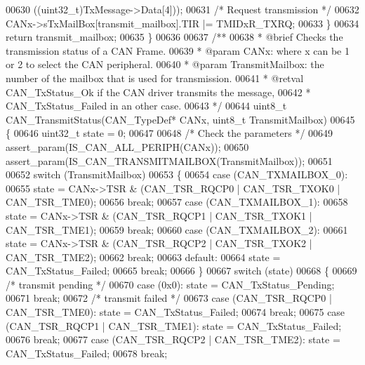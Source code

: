 \begin{DoxyCode}
00630                                              ((uint32\_t)TxMessage->Data[4]));
00631     \textcolor{comment}{/* Request transmission */}
00632     CANx->sTxMailBox[transmit\_mailbox].TIR |= TMIDxR_TXRQ;
00633   \}
00634   \textcolor{keywordflow}{return} transmit\_mailbox;
00635 \}
00636 
00637 \textcolor{comment}{/**}
00638 \textcolor{comment}{  * @brief  Checks the transmission status of a CAN Frame.}
00639 \textcolor{comment}{  * @param  CANx: where x can be 1 or 2 to select the CAN peripheral.}
00640 \textcolor{comment}{  * @param  TransmitMailbox: the number of the mailbox that is used for transmission.}
00641 \textcolor{comment}{  * @retval CAN\_TxStatus\_Ok if the CAN driver transmits the message, }
00642 \textcolor{comment}{  *         CAN\_TxStatus\_Failed in an other case.}
00643 \textcolor{comment}{  */}
00644 uint8\_t CAN_TransmitStatus(CAN\_TypeDef* CANx, uint8\_t TransmitMailbox)
00645 \{
00646   uint32\_t state = 0;
00647 
00648   \textcolor{comment}{/* Check the parameters */}
00649   assert_param(IS\_CAN\_ALL\_PERIPH(CANx));
00650   assert_param(IS\_CAN\_TRANSMITMAILBOX(TransmitMailbox));
00651 
00652   \textcolor{keywordflow}{switch} (TransmitMailbox)
00653   \{
00654     \textcolor{keywordflow}{case} (CAN_TXMAILBOX_0):
00655       state =   CANx->TSR &  (CAN_TSR_RQCP0 | CAN_TSR_TXOK0 | CAN_TSR_TME0);
00656       \textcolor{keywordflow}{break};
00657     \textcolor{keywordflow}{case} (CAN_TXMAILBOX_1):
00658       state =   CANx->TSR &  (CAN_TSR_RQCP1 | CAN_TSR_TXOK1 | CAN_TSR_TME1);
00659       \textcolor{keywordflow}{break};
00660     \textcolor{keywordflow}{case} (CAN_TXMAILBOX_2):
00661       state =   CANx->TSR &  (CAN_TSR_RQCP2 | CAN_TSR_TXOK2 | CAN_TSR_TME2);
00662       \textcolor{keywordflow}{break};
00663     \textcolor{keywordflow}{default}:
00664       state = CAN_TxStatus_Failed;
00665       \textcolor{keywordflow}{break};
00666   \}
00667   \textcolor{keywordflow}{switch} (state)
00668   \{
00669       \textcolor{comment}{/* transmit pending  */}
00670     \textcolor{keywordflow}{case} (0x0): state = CAN_TxStatus_Pending;
00671       \textcolor{keywordflow}{break};
00672       \textcolor{comment}{/* transmit failed  */}
00673      \textcolor{keywordflow}{case} (CAN_TSR_RQCP0 | CAN_TSR_TME0): state = CAN_TxStatus_Failed;
00674       \textcolor{keywordflow}{break};
00675      \textcolor{keywordflow}{case} (CAN_TSR_RQCP1 | CAN_TSR_TME1): state = CAN_TxStatus_Failed;
00676       \textcolor{keywordflow}{break};
00677      \textcolor{keywordflow}{case} (CAN_TSR_RQCP2 | CAN_TSR_TME2): state = CAN_TxStatus_Failed;
00678       \textcolor{keywordflow}{break};

\end{DoxyCode}
